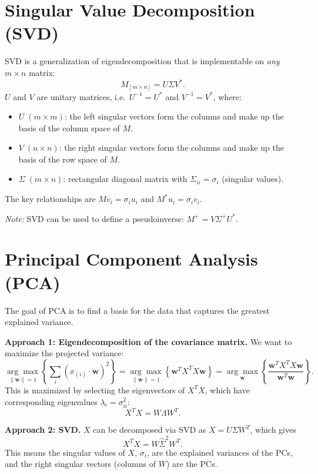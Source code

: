\documentclass[11pt]{article}
\begin{document}
\section{Singular Value Decomposition (SVD)}

SVD is a generalization of eigendecomposition that is implementable on \emph{any} $m \times n$ matrix:
\[
    M_{[m \times n]} = U \Sigma V^*.
\]
$U$ and $V$ are unitary matrices, i.e.\ $U^{-1} = U^*$ and $V^{-1} = V^*$, where:
\begin{itemize}
    \item $U \; (m \times m)$: the left singular vectors form the columns and make up the basis of the column space of $M$.
    \item $V \; (n \times n)$: the right singular vectors form the columns and make up the basis of the row space of $M$.
    \item $\Sigma \; (m \times n)$: rectangular diagonal matrix with $\Sigma_{ii} = \sigma_i$ (singular values).
\end{itemize}

The key relationships are $M v_i = \sigma_i u_i$ and $M^* u_i = \sigma_i v_i$.

\textit{Note:} SVD can be used to define a pseudoinverse: $M^+ = V \Sigma^+ U^*$.

\section{Principal Component Analysis (PCA)}

The goal of PCA is to find a basis for the data that captures the greatest explained variance.

\textbf{Approach 1: Eigendecomposition of the covariance matrix.}
We want to maximize the projected variance:
\[
    \underset{\|\bm{w}\|=1}{\arg\max} \left\{ \sum_i (x_{(i)} \cdot \bm{w})^2 \right\}
    = \underset{\|\bm{w}\|=1}{\arg\max} \left\{ \bm{w}^T X^T X \bm{w} \right\}
    = \underset{\bm{w}}{\arg\max} \left\{ \frac{\bm{w}^T X^T X \bm{w}}{\bm{w}^T \bm{w}} \right\}.
\]
This is maximized by selecting the eigenvectors of $X^T X$, which have corresponding eigenvalues $\lambda_i = \sigma_{ii}^2$:
\begin{equation}\label{eq:pca_eigen}
    X^T X = W \Lambda W^T.
\end{equation}

\textbf{Approach 2: SVD.}
$X$ can be decomposed via SVD as $X = U \Sigma W^T$, which gives
\[
    X^T X = W \hat{\Sigma}^2 W^T.
\]
This means the singular values of $X$, $\sigma_i$, are the explained variances of the PCs, and the right singular vectors (columns of $W$) are the PCs.
\end{document}
